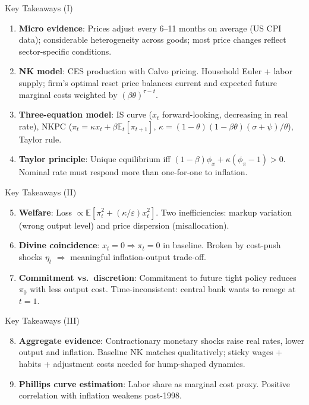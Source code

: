 \documentclass[blue]{beamer}
\newcommand{\E}{\mathbb{E}}
\begin{document}
\begin{frame}{Key Takeaways (I)}
\begin{enumerate}
    \item \textbf{Micro evidence}: Prices adjust every 6--11 months on average (US CPI data); considerable heterogeneity across goods; most price changes reflect sector-specific conditions.

    \item \textbf{NK model}: CES production with Calvo pricing. Household Euler + labor supply; firm's optimal reset price balances current and expected future marginal costs weighted by $(\beta\theta)^{\tau-t}$.

    \item \textbf{Three-equation model}: IS curve ($x_t$ forward-looking, decreasing in real rate), NKPC ($\pi_t = \kappa x_t + \beta \E_t[\pi_{t+1}]$, $\kappa = (1-\theta)(1-\beta\theta)(\sigma+\psi)/\theta$), Taylor rule.

    \item \textbf{Taylor principle}: Unique equilibrium iff $(1-\beta)\phi_x + \kappa(\phi_\pi - 1) > 0$. Nominal rate must respond more than one-for-one to inflation.
\end{enumerate}
\end{frame}

\begin{frame}{Key Takeaways (II)}
\begin{enumerate}
    \setcounter{enumi}{4}
    \item \textbf{Welfare}: Loss $\propto \E[\pi_t^2 + (\kappa/\varepsilon)x_t^2]$. Two inefficiencies: markup variation (wrong output level) and price dispersion (misallocation).

    \item \textbf{Divine coincidence}: $x_t = 0 \Rightarrow \pi_t = 0$ in baseline. Broken by cost-push shocks $\eta_t$ $\Rightarrow$ meaningful inflation-output trade-off.

    \item \textbf{Commitment vs.\ discretion}: Commitment to future tight policy reduces $\pi_0$ with less output cost. Time-inconsistent: central bank wants to renege at $t = 1$.
\end{enumerate}
\end{frame}

\begin{frame}{Key Takeaways (III)}
\begin{enumerate}
    \setcounter{enumi}{7}
    \item \textbf{Aggregate evidence}: Contractionary monetary shocks raise real rates, lower output and inflation. Baseline NK matches qualitatively; sticky wages + habits + adjustment costs needed for hump-shaped dynamics.

    \item \textbf{Phillips curve estimation}: Labor share as marginal cost proxy. Positive correlation with inflation weakens post-1998.
\end{enumerate}
\end{frame}
\end{document}
